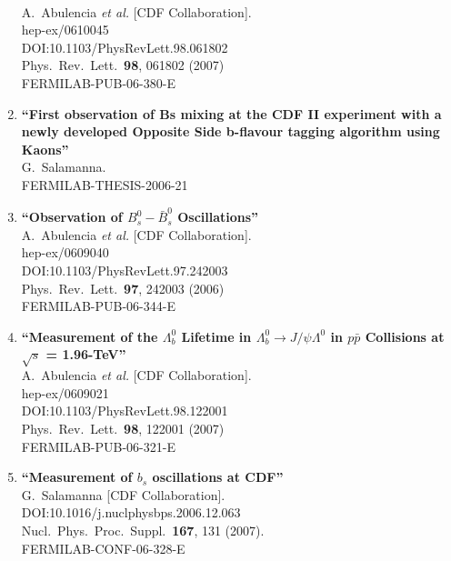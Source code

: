 \documentclass{article}
\begin{document}
\begin{enumerate}
  \\{}A.~Abulencia {\it et al.} [CDF Collaboration].
  \\{}hep-ex/0610045
  \\{}DOI:10.1103/PhysRevLett.98.061802
  \\{}Phys.\ Rev.\ Lett.\  {\bf 98}, 061802 (2007)
  \\{}FERMILAB-PUB-06-380-E
\item%
{\bf ``First observation of Bs mixing at the CDF II experiment with a newly developed Opposite Side b-flavour tagging algorithm using Kaons''}
  \\{}G.~Salamanna.
  \\{}FERMILAB-THESIS-2006-21
\item%
{\bf ``Observation of $B^0_s - \bar{B}^0_s$ Oscillations''}
  \\{}A.~Abulencia {\it et al.} [CDF Collaboration].
  \\{}hep-ex/0609040
  \\{}DOI:10.1103/PhysRevLett.97.242003
  \\{}Phys.\ Rev.\ Lett.\  {\bf 97}, 242003 (2006)
  \\{}FERMILAB-PUB-06-344-E
\item%
{\bf ``Measurement of the $\Lambda^0_{b}$ Lifetime in $\Lambda^0_{b} \to J/\psi \Lambda^0$ in $p \bar{p}$ Collisions at $\sqrt{s}$ = 1.96-TeV''}
  \\{}A.~Abulencia {\it et al.} [CDF Collaboration].
  \\{}hep-ex/0609021
  \\{}DOI:10.1103/PhysRevLett.98.122001
  \\{}Phys.\ Rev.\ Lett.\  {\bf 98}, 122001 (2007)
  \\{}FERMILAB-PUB-06-321-E
\item%
{\bf ``Measurement of $b_s$ oscillations at CDF''}
  \\{}G.~Salamanna [CDF Collaboration].
  \\{}DOI:10.1016/j.nuclphysbps.2006.12.063
  \\{}Nucl.\ Phys.\ Proc.\ Suppl.\  {\bf 167}, 131 (2007).
  \\{}FERMILAB-CONF-06-328-E


\end{enumerate}
\end{document}
